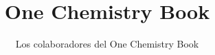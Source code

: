 \documentclass[11pt,a4paper,twoside,openany]{book}
\title{One Chemistry Book}
\author{Los colaboradores del One Chemistry Book}
\date{\bookdate}
\begin{document}
\frontmatter




\tableofcontents

\mainmatter



\appendix
\part{\omsolutionspart}


\backmatter
\printindex
\end{document}
